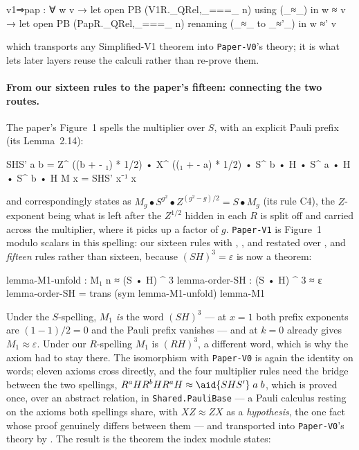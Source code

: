 \begin{agdacode}
v1⇒pap : ∀ {w v} → let open PB (V1R._QRel,_===_ n) using (_≈_) in
         w ≈ v → let open PB (PapR._QRel,_===_ n) renaming (_≈_ to _≈'_) in w ≈' v
\end{agdacode}

which transports any Simplified-V1 theorem into \texttt{Paper-V0}'s theory; it is
what lets later layers reuse the calculi rather than re-prove them.

\paragraph{From our sixteen rules to the paper's fifteen: connecting
the two routes.}  The paper's Figure~1 spells the multiplier over
$S$, with an explicit Pauli prefix (its Lemma~2.14):
\begin{agdacode}
SHS' a b = Z^ ((b + - ₁) * 1/2) • X^ ((₁ + - a) * 1/2)
           • S^ b • H • S^ a • H • S^ b • H
M x  = SHS' x⁻¹ x
\end{agdacode}
and correspondingly states  as
$M_g \bullet S^{g^2} \bullet Z^{(g^2-g)/2} = S \bullet M_g$ (its rule
C4), the $Z$-exponent being what is left after the $Z^{1/2}$ hidden in
each $R$ is split off and carried across the multiplier, where it picks
up a factor of $g$.  \texttt{Paper-V1} is Figure~1 modulo scalars in
this spelling: our sixteen rules with ,
,  and  restated over
, and \emph{fifteen} rules rather than sixteen, because
$(SH)^3 = \varepsilon$ is now a theorem:

\begin{agdacode}
lemma-M1-unfold : M₁ {n} ≈ (S • H) ^ 3
lemma-order-SH  : (S • H) ^ 3 ≈ ε
lemma-order-SH  = trans (sym lemma-M1-unfold) lemma-M1
\end{agdacode}

Under the $S$-spelling, $M_1$ \emph{is} the word $(SH)^3$ --- at $x = 1$
both prefix exponents are $(1-1)/2 = 0$ and the Pauli prefix vanishes ---
and  at $k = 0$ already gives $M_1 \approx \varepsilon$.
Under our $R$-spelling $M_1$ is $(RH)^3$, a different word, which
is why the axiom had to stay there.  The isomorphism with
\texttt{Paper-V0} is again the identity on words; eleven axioms cross
directly, and the four multiplier rules need the bridge between the two
spellings, $R^{a}HR^{b}HR^{a}H \approx \aid{SHS'}\;a\;b$, which is
proved once, over an abstract relation, in \texttt{Shared.PauliBase} ---
a Pauli calculus resting on the axioms both spellings share, with
$XZ \approx ZX$ as a \emph{hypothesis}, the one fact whose proof
genuinely differs between them --- and transported into
\texttt{Paper-V0}'s theory by .  The result is the
theorem the index module states:

